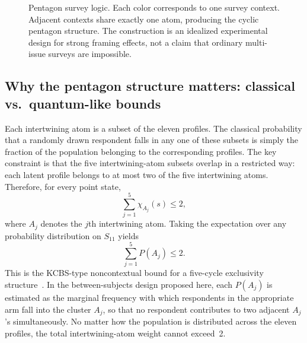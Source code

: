 \documentclass[aps,pra,twocolumn,superscriptaddress,floatfix,longbibliography]{revtex4-2}
\begin{document}
\begin{figure}[t]
\caption{Pentagon survey logic. Each color corresponds to one
survey context. Adjacent contexts share exactly one atom, producing
the cyclic pentagon structure. The construction is an idealized
experimental design for strong framing effects, not a claim that
ordinary multi-issue surveys are impossible.}
\label{fig:pentagon}
\end{figure}

\subsection{Why the pentagon structure matters: classical vs.\ quantum-like bounds}
\label{sec:pentagon-bounds}

Each intertwining atom is a subset of the eleven profiles. The
classical probability that a randomly drawn respondent falls in any
one of these subsets is simply the fraction of the population
belonging to the corresponding profiles. The key constraint is that
the five intertwining-atom subsets overlap in a restricted way:
each latent profile belongs to at most two of the five intertwining
atoms. Therefore, for every point state,
\[
\sum_{j=1}^{5}\chi_{A_j}(s)\leq 2,
\]
where $A_j$ denotes the $j$th intertwining atom. Taking the
expectation over any probability distribution on $S_{11}$ yields
\begin{equation}
\sum_{j=1}^{5} P(A_j) \leq 2.
\label{eq:classical_bound}
\end{equation}
This is the KCBS-type noncontextual bound for a five-cycle
exclusivity structure~\cite{Klyachko-2008,Bub-2009}. In the
between-subjects design proposed here, each $P(A_j)$ is estimated
as the marginal frequency with which respondents in the appropriate
arm fall into the cluster $A_j$, so that no respondent contributes
to two adjacent $A_j$'s simultaneously. No matter how the population
is distributed across the eleven profiles, the total
intertwining-atom weight cannot exceed~2.
\end{document}
